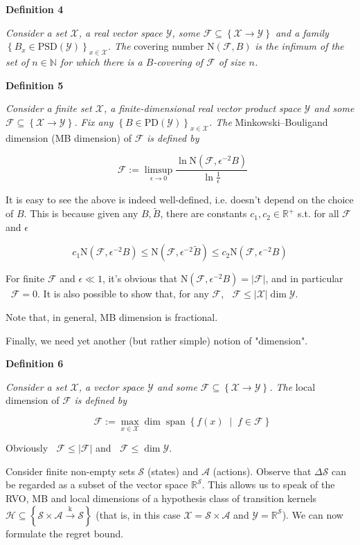 \documentclass[a4paper]{article}
\newcommand{\Co}[1]{}
\DeclareMathOperator{\Sp}{span}
\newcommand{\AP}[1]{\left(#1\right)}
\newcommand{\AC}[1]{\left\{#1\right\}}
\newcommand{\ACM}[2]{\left\{#1\;\middle\vert\;#2\right\}}
\newcommand{\Nats}{\mathbb{N}}
\newcommand{\Reals}{\mathbb{R}}
\newcommand{\PD}{\mathrm{PD}}
\newcommand{\PSD}{\mathrm{PSD}}
\newcommand{\Abs}[1]{\left\vert #1 \right\vert}
\newcommand{\K}{\xrightarrow{\mathrm{k}}}
\newcommand{\B}{B}
\newcommand{\X}{\mathcal{X}}
\newcommand{\Y}{\mathcal{Y}}
\newcommand{\F}{\mathcal{F}}
\newcommand{\St}{\mathcal{S}}
\newcommand{\A}{\mathcal{A}}
\newcommand{\Hy}{\mathcal{H}}
\DeclareMathOperator{\MB}{\dim_{MB}}
\DeclareMathOperator{\LD}{\dim_{loc}}
\newcommand{\N}{\mathrm{N}}
\begin{document}
\textbf{Definition 4}\Co{b}

\textit{Consider a set $\X$, a real vector space $\Y$, some $\F\subseteq\AC{\X\rightarrow\Y}$ and a family $\AC{\B _x\in\PSD(\Y)}_{x\in\X}$. The}\Co{i} covering number $\N(\F,\B )$ \textit{is the infimum of the set of $n\in\Nats$ for which there is a $\B $-covering of $\F$ of size $n$.}\Co{i}

\textbf{Definition 5}\Co{b}

\textit{Consider a finite set $\X$, a finite-dimensional real vector product space $\Y$ and some $\F\subseteq\AC{\X\rightarrow\Y}$. Fix any $\AC{\B \in\PD(\Y)}_{x\in\X}$.  The}\Co{i} Minkowski–Bouligand dimension (MB dimension) of $\F$ \textit{is defined by}\Co{i}

$$\MB{\F}:=\limsup_{\epsilon \rightarrow 0}{\frac{\ln{\N\AP{\F,\epsilon^{-2} \B }}}{\ln\frac{1}{\epsilon}}}$$

It is easy to see the above is indeed well-defined, i.e. doesn't depend on the choice of $\B $. This is because given any $\B ,\tilde{\B }$, there are constants $c_1,c_2\in\Reals^+$ s.t. for all $\F$ and $\epsilon$

$$c_1 \N\AP{\F,\epsilon^{-2} \B } \leq \N\AP{\F,\epsilon^{-2} \tilde{\B }} \leq c_2\N\AP{\F,\epsilon^{-2} \B }$$

For finite $\F$ and $\epsilon\ll1$, it's obvious that $\N\AP{\F,\epsilon^{-2}\B }=\Abs{\F}$, and in particular $\MB\F=0$. It is also possible to show that, for any $\F$, $\MB{\F}\leq\Abs{\X}\dim{\Y}$.

Note that, in general, MB dimension is fractional.

Finally, we need yet another (but rather simple) notion of "dimension".

\textbf{Definition 6}\Co{b}

\textit{Consider a set $\X$, a vector space $\Y$ and some $\F\subseteq\AC{\X\rightarrow\Y}$. The}\Co{i} local dimension of $\F$ \textit{is defined by}\Co{i}

$$\LD{\F}:=\max_{x\in\X}{\dim\Sp\ACM{f(x)}{f\in\F}}$$

Obviously $\LD{\F}\leq\Abs{\F}$ and $\LD{\F}\leq\dim{\Y}$.

Consider finite non-empty sets $\St$ (states) and $\A$ (actions). Observe that $\Delta\St$ can be regarded as a subset of the vector space $\Reals^\St$. This allows us to speak of the RVO, MB and local dimensions of a hypothesis class of transition kernels $\Hy\subseteq\AC{\St\times\A\K\St}$ (that is, in this case $\X=\St\times\A$ and $\Y=\Reals^\St$). We can now formulate the regret bound.
\end{document}
